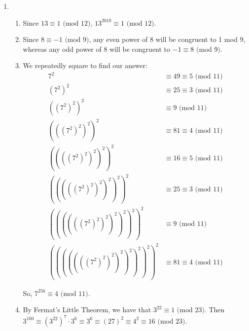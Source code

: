 \begin{enumerate}
    \item \begin{enumerate}
        \item Since $13\equiv 1\text{ (mod 12)}$, $13^{2018}\equiv\boxed{1\text{ (mod 12)}}$.
        \item Since $8\equiv -1\text{ (mod 9)}$, any even power of 8 will be congruent to 1 mod 9, whereas any odd power of 8 will be congruent to $-1\equiv\boxed{8\text{ (mod 9)}}$.
        \item We repeatedly square to find our answer:
        \begin{align*}
            7^2 &\equiv 49 \equiv 5 \text{ (mod 11)} \\
            (7^2)^2 &\equiv 25 \equiv 3 \text{ (mod 11)} \\
            ((7^2)^2)^2 &\equiv 9 \text{ (mod 11)} \\
            (((7^2)^2)^2)^2 &\equiv 81 \equiv 4 \text{ (mod 11)} \\
            ((((7^2)^2)^2)^2)^2 &\equiv 16 \equiv 5 \text{ (mod 11)} \\
            (((((7^2)^2)^2)^2)^2)^2 &\equiv 25 \equiv 3 \text{ (mod 11)} \\
            ((((((7^2)^2)^2)^2)^2)^2)^2 &\equiv 9 \text{ (mod 11)} \\
            (((((((7^2)^2)^2)^2)^2)^2)^2)^2 &\equiv 81 \equiv 4 \text{ (mod 11)}
        \end{align*}
        
        So, $7^{256}\equiv\boxed{4\text{ (mod 11)}}$.
        
        \item By Fermat's Little Theorem, we have that $3^{22}\equiv1\text{ (mod 23)}$. Then $3^{160}\equiv(3^{22})^7\cdot3^6\equiv3^6\equiv(27)^2\equiv4^2\equiv \boxed{16 \text{ (mod 23)}}$.
    \end{enumerate}
    

\end{enumerate}
